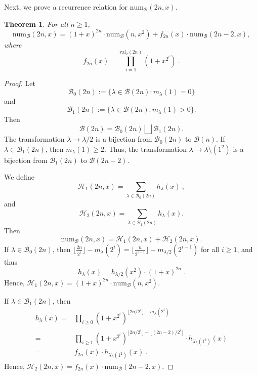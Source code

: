 \documentclass[reqno]{amsart}
\def\num{\mathrm{num}}
\def\val{\mathrm{val}}
\def\B{\mathcal{B}}
\newtheorem{theorem}{Theorem}[section]
\theoremstyle{definition}
\begin{document}
Next, we prove a recurrence relation for $\num_{\B}(2n,x)$.
\begin{theorem}
For all $n\geq 1$, 
\begin{equation*}
\num_\mathcal B(2n,x)=(1+x)^{2n}\cdot\num_\B(n,x^2)+ f_{2n}(x)\cdot\num_{\B}(2n-2,x),
\end{equation*}
where 
\begin{equation*}
    f_{2n}(x)=\prod_{i=1}^{\val_2(2n)}(1+x^{2^i})\:.
\end{equation*}
\end{theorem}
\begin{proof}
Let 
$$\mathcal B_0(2n):=\{ \lambda\in \mathcal B(2n): m_\lambda(1)=0\} 
$$
and 
$$\mathcal B_1(2n):=\{ \lambda\in \mathcal B(2n): m_\lambda(1)>0\}.$$
 Then  $$\mathcal B(2n)=\mathcal B_0(2n)\bigsqcup \mathcal B_1(2n).$$ 
The transformation $\lambda\to\lambda/2$ is a bijection from $\mathcal B_0(2n)$ to $\mathcal B(n)$.  If $\lambda \in \mathcal B_1(2n)$, then  $m_\lambda(1)\geq 2$. Thus, the transformation $\lambda\to \lambda\setminus(1^2)$ is a bijection from $\mathcal B_1(2n)$ to $\mathcal B(2n-2)$.


We define
 \begin{equation*}\label{eq:recursion_for_numast}
     \mathcal H_1(2n,x)=\sum_{\lambda\in  \B_0(2n)}h_\lambda(x)\:,
 \end{equation*}
and
\begin{equation*}
     \mathcal H_2(2n,x)=\sum_{\lambda\in  \B_1(2n)}h_\lambda(x).
 \end{equation*}
Then 
\begin{equation*}
\num_\mathcal B(2n,x)=\mathcal H_1(2n,x)+ \mathcal H_2(2n,x).
\end{equation*}
If  $\lambda\in \mathcal B_0(2n)$, then $\lfloor \frac{2n}{2^i}\rfloor-m_\lambda(2^i)=\lfloor \frac{n}{2^{i-1}}\rfloor-m_{\lambda/2}(2^{i-1})$ for all $i\geq 1$, and thus
    \[h_\lambda(x)=h_{\lambda/2}(x^2)\cdot(1+x)^{2n}\:.\]
Hence, $\mathcal H_1(2n,x)=(1+x)^{2n}\cdot\num_\B(n,x^2)$.

If $\lambda\in\B_1(2n)$,  then
    \begin{align*}
        h_\lambda(x)=&\prod_{i\geq 0}(1+x^{2^i})^{\lfloor 2n/2^i\rfloor-m_\lambda(2^i)}\\
        =& \prod_{i\geq 1}(1+x^{2^i})^{\lfloor 2n/2^i\rfloor-\lfloor(2n-2)/2^i\rfloor}\cdot h_{\lambda\setminus (1^2)}(x)\\
        =& f_{2n}(x)\cdot h_{\lambda\setminus (1^2)}(x)\:.
    \end{align*}
Hence, $\mathcal H_2(2n,x)=f_{2n}(x)\cdot\num_{\B}(2n-2,x)$.
\end{proof}
\end{document}
